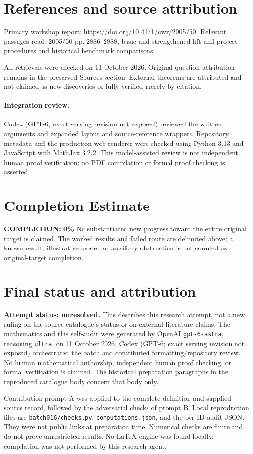 \documentclass[11pt]{article}
\begin{document}
\section{References and source attribution}
Primary workshop report: \url{https://doi.org/10.4171/owr/2005/50}. Relevant passages read: 2005/50 pp. 2886--2888, basic and strengthened lift-and-project procedures and historical benchmark comparisons.

All retrievals were checked on 11 October 2026. Original question attribution remains in the preserved Sources section. External theorems are attributed and not claimed as new discoveries or fully verified merely by citation.


\paragraph{Integration review.} Codex (GPT-6; exact serving revision not exposed) reviewed the written arguments and expanded layout and source-reference wrappers. Repository metadata and the production web renderer were checked using Python 3.13 and JavaScript with MathJax 3.2.2. This model-assisted review is not independent human proof verification; no PDF compilation or formal proof checking is asserted.

\section{Completion Estimate}
\noindent\textbf{COMPLETION: 0\%}
No substantiated new progress toward the entire original target is claimed. The worked results and failed route are delimited above; a known result, illustrative model, or auxiliary obstruction is not counted as original-target completion.

\section{Final status and attribution}
\textbf{Attempt status: unresolved.} This describes this research attempt, not a new ruling on the source catalogue's status or on external literature claims.
The mathematics and this self-audit were generated by OpenAI \texttt{gpt-6-astra}, reasoning \texttt{ultra}, on 11 October 2026. Codex (GPT-6; exact serving revision not exposed) orchestrated the batch and contributed formatting/repository review. No human mathematical authorship, independent human proof checking, or formal verification is claimed. The historical preparation paragraphs in the reproduced catalogue body concern that body only.

Contribution prompt A was applied to the complete definition and supplied source record, followed by the adversarial checks of prompt B. Local reproduction files are \texttt{batch016/checks.py}, \texttt{computations.json}, and the per-ID audit JSON. They were not public links at preparation time. Numerical checks are finite and do not prove unrestricted results. No LaTeX engine was found locally; compilation was not performed by this research agent.
\end{document}
